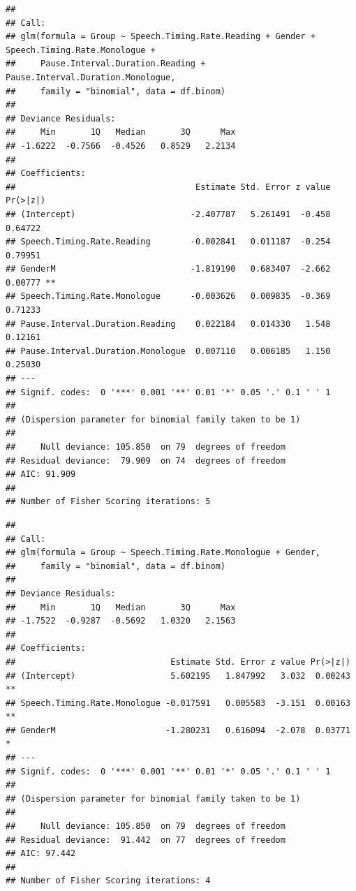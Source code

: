 \documentclass[
  english,
  doc,floatsintext]{apa6}
\begin{document}
\begin{verbatim}
## 
## Call:
## glm(formula = Group ~ Speech.Timing.Rate.Reading + Gender + Speech.Timing.Rate.Monologue + 
##     Pause.Interval.Duration.Reading + Pause.Interval.Duration.Monologue, 
##     family = "binomial", data = df.binom)
## 
## Deviance Residuals: 
##     Min       1Q   Median       3Q      Max  
## -1.6222  -0.7566  -0.4526   0.8529   2.2134  
## 
## Coefficients:
##                                    Estimate Std. Error z value Pr(>|z|)   
## (Intercept)                       -2.407787   5.261491  -0.458  0.64722   
## Speech.Timing.Rate.Reading        -0.002841   0.011187  -0.254  0.79951   
## GenderM                           -1.819190   0.683407  -2.662  0.00777 **
## Speech.Timing.Rate.Monologue      -0.003626   0.009835  -0.369  0.71233   
## Pause.Interval.Duration.Reading    0.022184   0.014330   1.548  0.12161   
## Pause.Interval.Duration.Monologue  0.007110   0.006185   1.150  0.25030   
## ---
## Signif. codes:  0 '***' 0.001 '**' 0.01 '*' 0.05 '.' 0.1 ' ' 1
## 
## (Dispersion parameter for binomial family taken to be 1)
## 
##     Null deviance: 105.850  on 79  degrees of freedom
## Residual deviance:  79.909  on 74  degrees of freedom
## AIC: 91.909
## 
## Number of Fisher Scoring iterations: 5
\end{verbatim}

\begin{verbatim}
## 
## Call:
## glm(formula = Group ~ Speech.Timing.Rate.Monologue + Gender, 
##     family = "binomial", data = df.binom)
## 
## Deviance Residuals: 
##     Min       1Q   Median       3Q      Max  
## -1.7522  -0.9287  -0.5692   1.0320   2.1563  
## 
## Coefficients:
##                               Estimate Std. Error z value Pr(>|z|)   
## (Intercept)                   5.602195   1.847992   3.032  0.00243 **
## Speech.Timing.Rate.Monologue -0.017591   0.005583  -3.151  0.00163 **
## GenderM                      -1.280231   0.616094  -2.078  0.03771 * 
## ---
## Signif. codes:  0 '***' 0.001 '**' 0.01 '*' 0.05 '.' 0.1 ' ' 1
## 
## (Dispersion parameter for binomial family taken to be 1)
## 
##     Null deviance: 105.850  on 79  degrees of freedom
## Residual deviance:  91.442  on 77  degrees of freedom
## AIC: 97.442
## 
## Number of Fisher Scoring iterations: 4
\end{verbatim}
\end{document}
